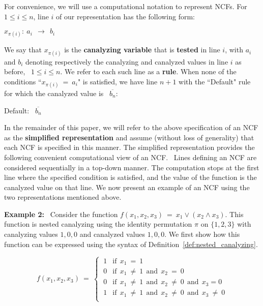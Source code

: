 \medskip
For convenience, we will use a computational notation to represent NCFs.
For $1 \leq i \leq n$, line $i$ of our representation has the following form:

\medskip

\noindent
\hspace*{1.1in} $x_{\pi(i)}:~ a_i ~~\longrightarrow~~ b_i$

\medskip

\noindent 
We say that $x_{\pi(i)}$ is the \textbf{canalyzing variable} that is
\textbf{tested} in line $i$, 
with $a_i$ and $b_i$ denoting respectively the canalyzing and 
canalyzed values in line $i$ as before,~ $1 \leq i \leq n$.
We refer to each such line as a \textbf{rule}.
When none of the conditions ``$x_{\pi(i)} ~=~ a_i$" 
is satisfied, we have line $n+1$ with the ``Default" rule
for which the canalyzed value is~ $\overline{b_n}$: 

\medskip

\noindent
\hspace*{1.1in} Default:~ $\overline{b_n}$

\medskip
\noindent
In the remainder of this paper, we will refer to the above specification
of an NCF as the \textbf{simplified representation} and assume
(without loss of generality) that each NCF is specified in this manner.
The simplified representation provides the following 
convenient computational view of an NCF.~
Lines defining an NCF are 
considered sequentially in a top-down manner.
The computation stops at the first line where the 
specified condition is satisfied, and the value of the function
is the canalyzed value on that line. 
We now present an example of an NCF using the two representations
mentioned above.


\medskip
\noindent
\textbf{Example 2:}~ Consider the function 
$f(x_1, x_2, x_3) ~=~ x_1 \vee (x_2 \wedge x_3)$.
This function is nested canalyzing using the identity permutation $\pi$ on $\{1,2,3\}$
with canalyzing values $1,0,0$ and canalyzed values $1, 0, 0$.
We first show how this function can be expressed using the syntax of
Definition~\ref{def:nested_canalyzing}.

\[
f(x_1, x_2, x_3) ~=~ 
   \begin{cases}
       \:1 & \mathrm{if~~} x_{1} ~=~ 1 \\
       \:0 & \mathrm{if~~} x_{1} ~\neq~ 1 \mathrm{~~and~~}
            x_{2} ~=~ 0 \\
       \:0 & \mathrm{if~~} x_{1} ~\neq~ 1 \mathrm{~~and~~}
            x_{2} ~\neq~ 0 \mathrm{~~and~~} x_{3} = 0 \\
       \:1 & \mathrm{if~~} x_{1} ~\neq~ 1 \mathrm{~~and~~}
            x_{2} ~\neq~ 0 \mathrm{~~and~~} x_{3} ~\neq~ 0 \\
   \end{cases}
\]

